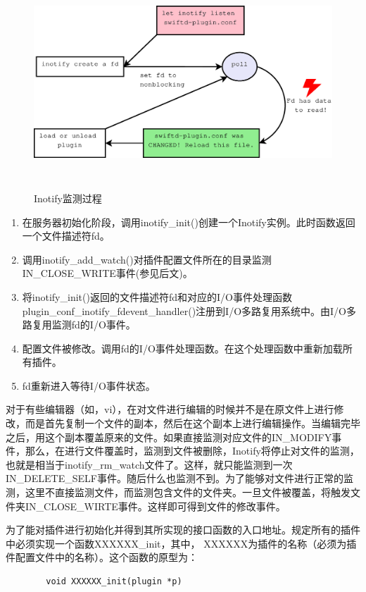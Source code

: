 \documentclass[12pt, twoside, a4paper, xetex]{report}
\begin{document}
	\begin{figure}[htbp]
	\centering
	\caption{Inotify监测过程}
	\label{inotify}
	\includegraphics[height=8cm, width=15cm]{pics/inotify.eps}
	\end{figure}
	
	\begin{enumerate}
		\item 在服务器初始化阶段，调用inotify\_init()创建一个Inotify实例。此时函数返回一个文件描述符fd。
		\item 调用inotify\_add\_watch()对插件配置文件所在的目录监测IN\_CLOSE\_WRITE事件(参见后文)。
		\item 将inotify\_init()返回的文件描述符fd和对应的I/O事件处理函数\\plugin\_conf\_inotify\_fdevent\_handler()注册到I/O多路复用系统中。由I/O多路复用监测fd的I/O事件。
		\item 配置文件被修改。调用fd的I/O事件处理函数。在这个处理函数中重新加载所有插件。
		\item fd重新进入等待I/O事件状态。
	\end{enumerate}
	
	对于有些编辑器（如，vi），在对文件进行编辑的时候并不是在原文件上进行修改，而是首先复制一个文件的副本，然后在这个副本上进行编辑操作。当编辑完毕之后，用这个副本覆盖原来的文件。如果直接监测对应文件的IN\_MODIFY事件，那么，在进行文件覆盖时，监测到文件被删除，Inotify将停止对文件的监测，也就是相当于inotify\_rm\_watch文件了。这样，就只能监测到一次IN\_DELETE\_SELF事件。随后什么也监测不到。为了能够对文件进行正常的监测，这里不直接监测文件，而监测包含文件的文件夹。一旦文件被覆盖，将触发文件夹IN\_CLOSE\_WIRTE事件。这样即可得到文件的修改事件。
	
	为了能对插件进行初始化并得到其所实现的接口函数的入口地址。规定所有的插件中必须实现一个函数XXXXXX\_init，其中，	XXXXXX为插件的名称（必须为插件配置文件中的名称）。这个函数的原型为：
	\begin{verbatim}
        void XXXXXX_init(plugin *p)
	\end{verbatim}
	
\end{document}
